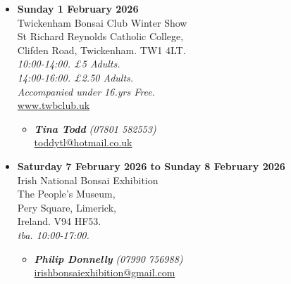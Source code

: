 \begin{itemize}
    \item \textbf{Sunday 1 February 2026}
    \\
    Twickenham Bonsai Club Winter Show \\
    St Richard Reynolds Catholic College, \\
    Clifden Road, Twickenham. TW1 4LT.
    \\
    \emph{10:00-14:00. £5 Adults.} \\
    \emph{14:00-16:00. £2.50 Adults.} \\
    \emph{Accompanied under 16.yrs Free.}
    \\
    \href{https://www.twbclub.uk}{www.twbclub.uk}
    \begin{itemize}
        \item \textbf{\emph{Tina Todd}} \emph{(07801 582553)} \\
        \href{mailto:toddytl@hotmail.co.uk}{toddytl@hotmail.co.uk} 
    \end{itemize}

    \item \textbf{Saturday 7 February 2026 to Sunday 8 February 2026}
    \\
    Irish National Bonsai Exhibition \\
    The People's Museum, \\
    Pery Square, Limerick, \\
    Ireland. V94 HF53.
    \\
    \emph{tba. 10:00-17:00.}
    \begin{itemize}
        \item \textbf{\emph{Philip Donnelly}} \emph{(07990 756988)} \\
        \href{mailto:irishbonsaiexhibition@gmail.com}{irishbonsaiexhibition@gmail.com} 
    \end{itemize}


\end{itemize}
